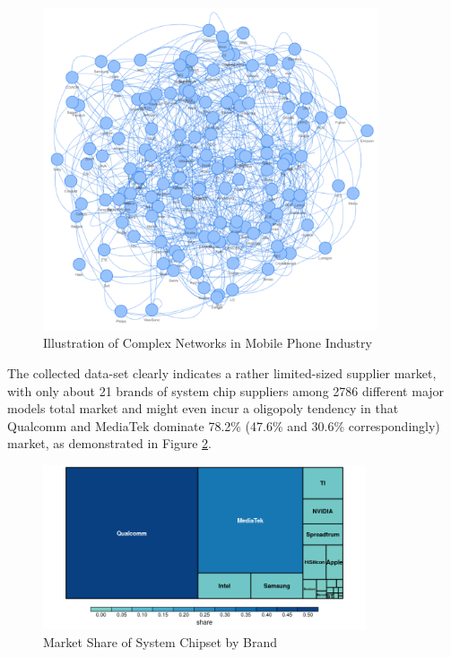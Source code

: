 \documentclass[utf8,english]{gradu3}
\begin{document}
\begin{figure}[htb]
    \centering
    \includegraphics[width=0.88\textwidth]{network.png}
    \caption{Illustration of Complex Networks in Mobile Phone Industry}
    \label{fig:networks}
\end{figure}

The collected data-set clearly indicates a rather limited-sized supplier market, with only about 21 brands of system chip suppliers among 2786 different major models total market and might even incur a oligopoly tendency in that Qualcomm and MediaTek dominate 78.2\% (47.6\% and 30.6\% correspondingly) market, as demonstrated in Figure \ref{fig:systemchip}.

\begin{figure}[htb]
    \centering
    \includegraphics[width=0.85\textwidth]{systemchip.png}
    \caption{Market Share of System Chipset by Brand}
    \label{fig:systemchip}
\end{figure}
\end{document}
